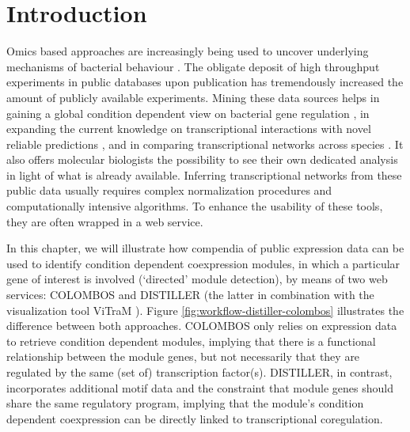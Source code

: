 
\section{Introduction}

Omics based approaches are increasingly being used to uncover underlying 
mechanisms of bacterial behaviour \cite{Fierro2008}. The obligate deposit of 
high throughput experiments in public databases upon publication has 
tremendously increased the amount of publicly available experiments. Mining 
these data sources helps in gaining a global condition dependent view on 
bacterial gene regulation \cite{Lemmens2009, Fadda2009}, in expanding the 
current knowledge on transcriptional interactions with novel reliable 
predictions \cite{Faith2007, Ernst2008}, and in comparing transcriptional 
networks across species \cite{Fierro2008, Babu2009}. It also offers molecular 
biologists the possibility to see their own dedicated analysis in light of what 
is already available. Inferring transcriptional networks from these public data 
usually requires complex normalization procedures \cite{Faith2008} and 
computationally intensive algorithms. To enhance the usability of these tools, 
they are often wrapped in a web service.

In this chapter, we will illustrate how compendia of public expression 
data can be used to identify condition dependent coexpression modules, in which 
a particular gene of interest is involved (`directed' module detection), by 
means of two web services: COLOMBOS \cite{Engelen2011} and DISTILLER 
\cite{Lemmens2009} (the latter in combination with the visualization tool 
ViTraM \cite{Sun2009}). Figure \ref{fig:workflow-distiller-colombos}
illustrates the difference between both approaches. COLOMBOS only relies on 
expression data to retrieve condition dependent modules, implying that there is 
a functional relationship between the module genes, but not necessarily that 
they are regulated by the same (set of) transcription factor(s). DISTILLER, in 
contrast, incorporates additional motif data and the constraint that module 
genes should share the same regulatory program, implying that the module's 
condition dependent coexpression can be directly linked to transcriptional 
coregulation. 

